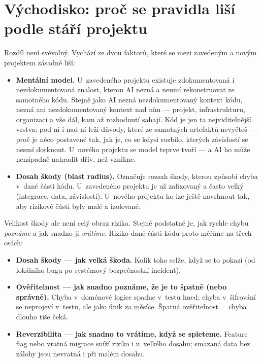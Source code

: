 \section{Východisko: proč se pravidla liší podle stáří projektu}

Rozdíl není svévolný.
Vychází ze dvou faktorů, které se mezi zavedeným a novým projektem zásadně liší:

\begin{itemize}
\item \textbf{Mentální model.}
U~zavedeného projektu existuje zdokumentovaná i nezdokumentovaná znalost, kterou AI nezná a neumí rekonstruovat ze samotného kódu.
Stejně jako AI nezná nezdokumentovaný kontext kódu, nezná ani nezdokumentovaný kontext nad ním --- projekt, infrastrukturu, organizaci a vše dál, kam až rozhodnutí sahají.
Kód je jen ta nejviditelnější vrstva; pod ní i nad ní leží důvody, které ze samotných artefaktů nevyčteš --- proč je něco postavené tak, jak je, co se kdysi rozbilo, kterých závislostí se nesmí dotknout.
U~nového projektu se model teprve tvoří --- a AI ho může nenápadně nahradit dřív, než vznikne.
\item \textbf{Dosah škody (blast radius).}
Označuje rozsah škody, kterou způsobí chyba v~dané části kódu.
U~zavedeného projektu je už zafixovaný a často velký (integrace, data, závislosti).
U~nového projektu ho lze ještě navrhnout tak, aby rizikové části byly malé a izolované.
\end{itemize}

Velikost škody ale není celý obraz rizika.
Stejně podstatné je, jak rychle chybu \emph{poznáme} a jak snadno ji \emph{vrátíme}.
Riziko dané části kódu proto měříme na třech osách:

\begin{itemize}
\item \textbf{Dosah škody --- jak velká škoda.}
Kolik toho selže, když se to pokazí (od lokálního bugu po systémový bezpečnostní incident).
\item \textbf{Ověřitelnost --- jak snadno poznáme, že je to špatně (nebo správně).}
Chyba v~doménové logice spadne v~testu hned; chyba v~šifrování se neprojeví v~testu, ale jako únik za měsíce.
Špatná ověřitelnost = chyba dlouho tiše čeká.
\item \textbf{Reverzibilita --- jak snadno to vrátíme, když se spleteme.}
Feature flag nebo vratná migrace sníží riziko i u~velkého dosahu; smazaná data bez zálohy jsou nevratná i při malém dosahu.
\end{itemize}


